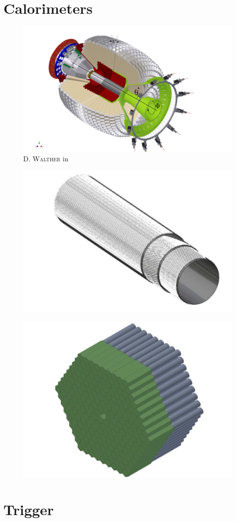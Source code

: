 \section{Calorimeters}
\begin{figure}[htbp]
	\centering
	\includegraphics[width=\linewidth]{figs/cb_fp_in.pdf}
	\caption{\textsc{D. Walther} in \cite{urban}}
\end{figure}
\begin{figure}[htbp]
	\centering
	\includegraphics[width=.5\linewidth]{figs/faserorient.pdf}
	\caption{\cite{cb}}
\end{figure}
\begin{figure}[htbp]
	\centering
	\includegraphics[width=.5\linewidth]{figs/mini-taps.pdf}
	\caption{\cite{cb}}
\end{figure}

\section{Trigger}